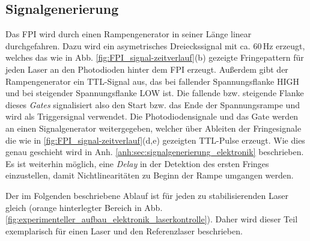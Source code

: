 \subsection{Signalgenerierung}\label{subsec:signalgenerierung}
Das FPI wird durch einen Rampengenerator in seiner Länge linear durchgefahren.
Dazu wird ein asymetrisches Dreieckssignal mit ca. $60\,$Hz erzeugt, welches das
wie in Abb.
\ref{fig:FPI_signal-zeitverlauf}(b) gezeigte Fringepattern für jeden Laser
an den Photodioden hinter dem FPI erzeugt. Außerdem gibt der Rampengenerator
ein TTL-Signal aus, das bei fallender Spannungsflanke HIGH und bei
steigender Spannungsflanke LOW ist. Die fallende bzw. steigende Flanke dieses
\textit{Gates} signalisiert also den Start bzw. das Ende der Spannungsrampe
und wird als Triggersignal verwendet. Die Photodiodensignale und das
Gate werden an einen Signalgenerator weitergegeben, welcher über Ableiten der
Fringesignale die wie in \ref{fig:FPI_signal-zeitverlauf}(d,e) gezeigten TTL-Pulse erzeugt.
Wie dies genau geschieht wird in Anh.
\ref{anh:sec:signalgenerierung_elektronik} beschrieben. Es ist weiterhin
möglich, eine \textit{Delay} in der Detektion des ersten Fringes einzustellen,
damit Nichtlinearitäten zu Beginn der Rampe umgangen werden.\par
Der im Folgenden beschriebene Ablauf ist für jeden zu stabilisierenden Laser
gleich (orange hinterlegter Bereich in Abb.
\ref{fig:experimenteller_aufbau_elektronik_laserkontrolle}). Daher wird dieser
Teil exemplarisch für einen Laser und den Referenzlaser beschrieben.

